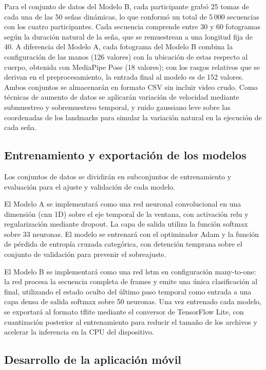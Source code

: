 Para el conjunto de datos del Modelo B, cada participante grabó 25 tomas de cada una de
las 50 señas dinámicas, lo que conformó un total de 5\,000 secuencias con los
cuatro participantes. Cada secuencia comprende entre 30 y 60 fotogramas según la duración
natural de la seña, que se remuestrean a una longitud fija de 40. A diferencia del Modelo A,
cada fotograma del Modelo B combina la configuración de las manos (126 valores) con la
ubicación de estas respecto al cuerpo, obtenida con MediaPipe Pose (18 valores); con los
rasgos relativos que se derivan en el preprocesamiento, la entrada final al modelo es de 152
valores. Ambos conjuntos se almacenarán en formato CSV sin incluir video crudo. Como técnicas de aumento de datos se aplicarán variación de velocidad
mediante submuestreo y sobremuestreo temporal, y ruido gaussiano leve sobre las
coordenadas de los landmarks para simular la variación natural en la ejecución de cada
seña.

\subsection{Entrenamiento y exportación de los modelos}

Los conjuntos de datos se dividirán en subconjuntos de entrenamiento y evaluación para
el ajuste y validación de cada modelo.

El Modelo A se implementará como una red neuronal convolucional en una dimensión
(\acrshort{cnn} 1D) sobre el eje temporal de la ventana, con activación \acrshort{relu} y regularización
mediante dropout. La capa de salida utiliza la función softmax sobre 33 neuronas. El modelo se entrenará con el optimizador Adam y la
función de pérdida de entropía cruzada categórica, con detención temprana sobre el
conjunto de validación para prevenir el sobreajuste.

El Modelo B se implementará como una red \acrshort{lstm} en configuración many-to-one: la red
procesa la secuencia completa de frames y emite una única clasificación al final,
utilizando el estado oculto del último paso temporal como entrada a una capa densa de
salida softmax sobre 50 neuronas. Una vez entrenado cada modelo, se exportará al formato
\acrshort{tflite} mediante el conversor de TensorFlow Lite, con cuantización posterior al
entrenamiento para reducir el tamaño de los archivos y acelerar la inferencia en la
CPU del dispositivo.

\subsection{Desarrollo de la aplicación móvil}

